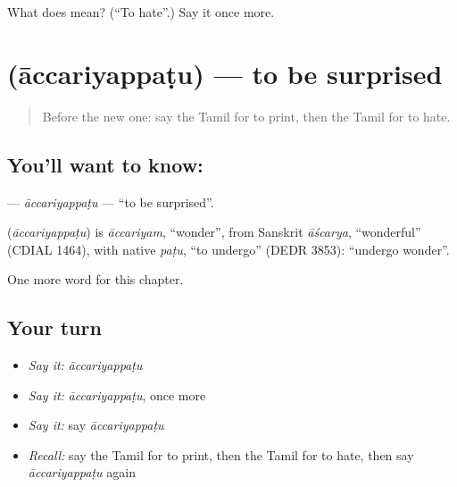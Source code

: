 \begin{tcolorbox}[breakable,colback=teal!4,colframe=teal!35!black,title={Before you move on}]
What does  mean? (\textquotedblleft{}To hate\textquotedblright{}.) Say it once more.
\end{tcolorbox}
\section[\texorpdfstring{\ta{ஆச்சரியப்படு} (āccariyappaṭu)}{ஆச்சரியப்படு (āccariyappaṭu)}]{ (āccariyappaṭu) — to be surprised}

\label{lesson:TA-C257-accariyappatu}



\begin{quote}
Before the new one: say the Tamil for to print, then the Tamil for to hate.
\end{quote}

\subsection*{You'll want to know: }
\textbf{} — \emph{āccariyappaṭu} — \textquotedblleft{}to be surprised\textquotedblright{}.

\begin{cousinweb}
\textbf{} (\emph{āccariyappaṭu}) is \emph{āccariyam}, \textquotedblleft{}wonder\textquotedblright{}, from Sanskrit \emph{āścarya}, \textquotedblleft{}wonderful\textquotedblright{} (CDIAL 1464), with native \emph{paṭu}, \textquotedblleft{}to undergo\textquotedblright{} (DEDR 3853): \textquotedblleft{}undergo wonder\textquotedblright{}.
\end{cousinweb}

\begin{grammarlens}[title={What you've built}]
One more word for this chapter.
\end{grammarlens}

\subsection*{Your turn}
\begin{itemize}
\raggedright
  \item \emph{Say it:} \emph{āccariyappaṭu}
  \item \emph{Say it:} \emph{āccariyappaṭu}, once more
  \item \emph{Say it:} say \emph{āccariyappaṭu}
  \item \emph{Recall:} say the Tamil for to print, then the Tamil for to hate, then say \emph{āccariyappaṭu} again
\end{itemize}

